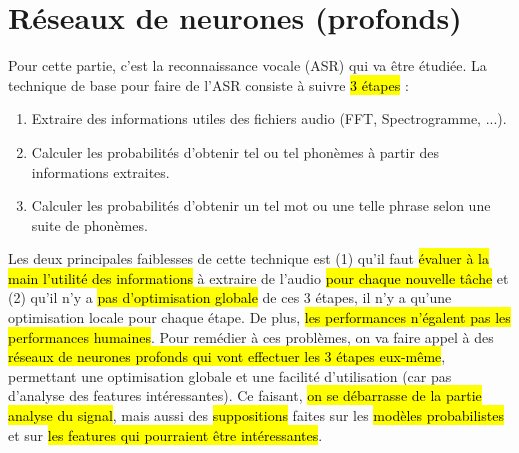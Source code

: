 \documentclass[letterpaper, 12pt]{article}
\newcommand{\alinea}{
\hspace*{0.5cm}}
\begin{document}
	\section{Réseaux de neurones (profonds)}
		\alinea Pour cette partie, c'est la reconnaissance vocale (ASR) qui va être étudiée. La technique de base pour faire de l'ASR
			consiste à suivre \hl{3 étapes} :
			\begin{enumerate}
				\setlength\itemsep{0cm}
				\item Extraire des informations utiles des fichiers audio (FFT, Spectrogramme, ...).
				\item Calculer les probabilités d'obtenir tel ou tel phonèmes à partir des informations extraites.
				\item Calculer les probabilités d'obtenir un tel mot ou une telle phrase selon une suite de phonèmes.
			\end{enumerate}
		\alinea Les deux principales faiblesses de cette technique est (1) qu'il faut \hl{évaluer à la main l'utilité des informations} à
			extraire de l'audio \hl{pour chaque nouvelle tâche} et (2) qu'il n'y a \hl{pas d'optimisation globale} de ces 3 étapes, 
			il n'y a qu'une optimisation locale pour chaque étape. De plus, \hl{les performances n'égalent pas les performances humaines}.
			Pour remédier à ces problèmes, on va faire appel à des \hl{réseaux de neurones profonds qui vont effectuer les 3 étapes eux-même},
			permettant une optimisation globale et une facilité d'utilisation (car pas d'analyse des features intéressantes).
			Ce faisant, \hl{on se débarrasse de la partie analyse du signal}, mais aussi des \hl{suppositions} faites sur les 
			\hl{modèles probabilistes} et sur \hl{les features qui pourraient être intéressantes}.
\end{document}
